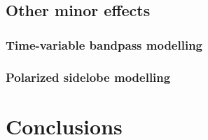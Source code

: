 \documentclass[twocolumn]{../../common/aa}
\begin{document}
\subsection{Other minor effects}
\label{sec:minor}

\subsubsection{Time-variable bandpass modelling}

\subsubsection{Polarized sidelobe modelling}


\section{Conclusions}
\label{sec:conclusions}
\end{document}

